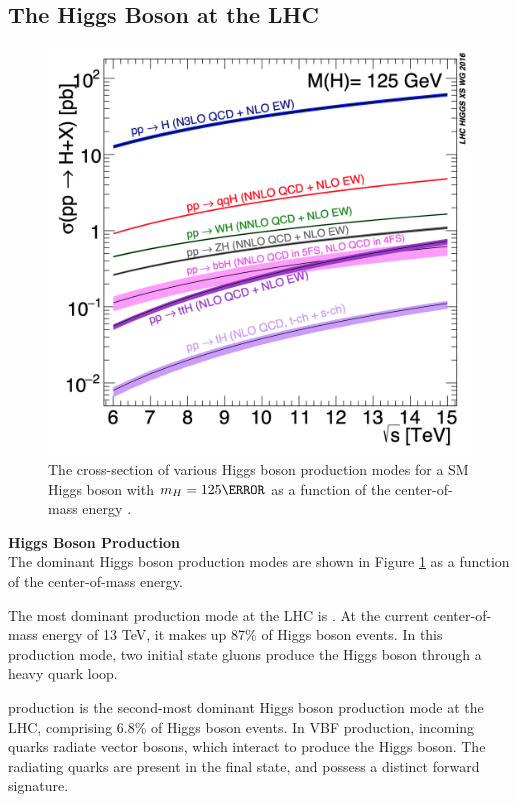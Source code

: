 \subsection{The Higgs Boson at the LHC}

\begin{figure}[!ht]
    \centering
    \includegraphics[width=.7\textwidth]{chapters/chapter1_theory/images/production_rates.png}
    \caption[The cross-section of various Higgs boson production modes for a as a function of the center-of-mass energy]{The cross-section of various Higgs boson production modes for a \gls{SM} Higgs boson with $m_{H}=\unit{125}{\GeV}$ as a function of the center-of-mass energy \cite{hh-crosssections}.}
    \label{fig:higgs-production-modes}
\end{figure}
\noindent \textbf{Higgs Boson Production}\\
\indent The dominant Higgs boson production modes are shown in Figure \ref{fig:higgs-production-modes} as a function of the center-of-mass energy.

The most dominant production mode at the \gls{LHC} is . At the current center-of-mass energy of 13 TeV, it makes up 87\% of Higgs boson events. In this production mode, two initial state gluons produce the Higgs boson through a heavy quark loop.

 production is the second-most dominant Higgs boson production mode at the \gls{LHC}, comprising 6.8\% of Higgs boson events. In \gls{VBF} production, incoming quarks radiate vector bosons, which interact to produce the Higgs boson. The radiating quarks are present in the final state, and possess a distinct forward signature.

